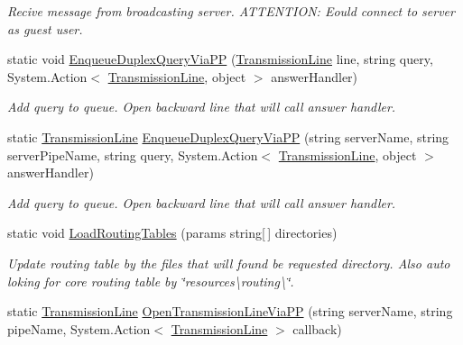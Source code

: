 \begin{DoxyCompactItemize}
\begin{DoxyCompactList}\small\item\em Recive message from broadcasting server. A\+T\+T\+E\+N\+T\+I\+ON\+: Eould connect to server as guest user. \end{DoxyCompactList}\item 
static void \mbox{\hyperlink{class_uniform_client_1_1_base_client_a964bd521f46fd99f64b10257c5d233ef}{Enqueue\+Duplex\+Query\+Via\+PP}} (\mbox{\hyperlink{class_pipes_provider_1_1_client_1_1_transmission_line}{Transmission\+Line}} line, string query, System.\+Action$<$ \mbox{\hyperlink{class_pipes_provider_1_1_client_1_1_transmission_line}{Transmission\+Line}}, object $>$ answer\+Handler)
\begin{DoxyCompactList}\small\item\em Add query to queue. Open backward line that will call answer handler. \end{DoxyCompactList}\item 
static \mbox{\hyperlink{class_pipes_provider_1_1_client_1_1_transmission_line}{Transmission\+Line}} \mbox{\hyperlink{class_uniform_client_1_1_base_client_a82dbf660ec06b5c05730ff57b63b4f28}{Enqueue\+Duplex\+Query\+Via\+PP}} (string server\+Name, string server\+Pipe\+Name, string query, System.\+Action$<$ \mbox{\hyperlink{class_pipes_provider_1_1_client_1_1_transmission_line}{Transmission\+Line}}, object $>$ answer\+Handler)
\begin{DoxyCompactList}\small\item\em Add query to queue. Open backward line that will call answer handler. \end{DoxyCompactList}\item 
static void \mbox{\hyperlink{class_uniform_client_1_1_base_client_a5f8f22aa4ab8219fb5f1b6a358f68daf}{Load\+Routing\+Tables}} (params string\mbox{[}$\,$\mbox{]} directories)
\begin{DoxyCompactList}\small\item\em Update routing table by the files that will found be requested directory. Also auto loking for core routing table by \char`\"{}resources\textbackslash{}routing\textbackslash{}\char`\"{}. \end{DoxyCompactList}\item 
static \mbox{\hyperlink{class_pipes_provider_1_1_client_1_1_transmission_line}{Transmission\+Line}} \mbox{\hyperlink{class_uniform_client_1_1_base_client_a851ce49c50011eb0ed2552663c7731ab}{Open\+Transmission\+Line\+Via\+PP}} (string server\+Name, string pipe\+Name, System.\+Action$<$ \mbox{\hyperlink{class_pipes_provider_1_1_client_1_1_transmission_line}{Transmission\+Line}} $>$ callback)

\end{DoxyCompactItemize}
